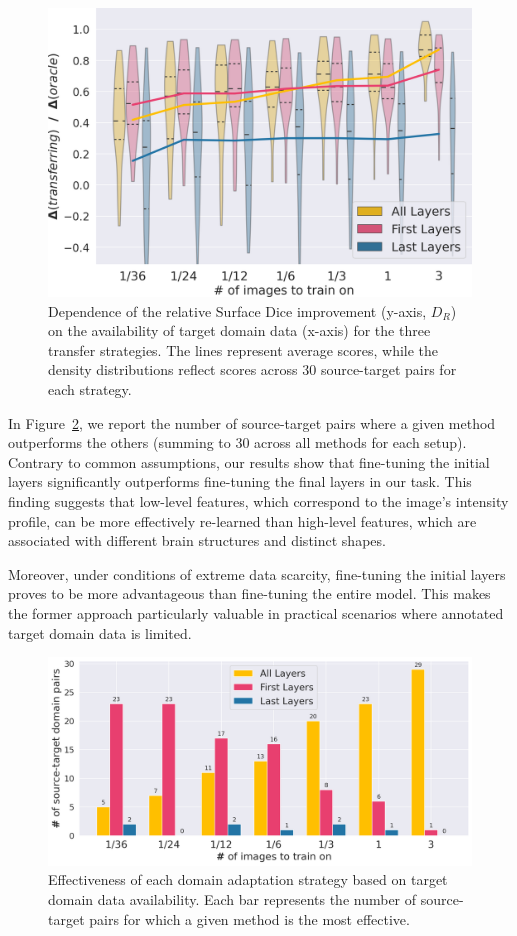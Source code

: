 \begin{figure}[h!]
	\includegraphics[width=\linewidth]{Dissertation/Figures/2_mri/gap.png}
	\caption{Dependence of the relative Surface Dice improvement (y-axis, $D_R$) on the availability of target domain data (x-axis) for the three transfer strategies. The lines represent average scores, while the density distributions reflect scores across 30 source-target pairs for each strategy.}
	\label{fig:gap}
\end{figure}

In Figure~\ref{fig:winners}, we report the number of source-target pairs where a given method outperforms the others (summing to 30 across all methods for each setup). Contrary to common assumptions, our results show that fine-tuning the initial layers significantly outperforms fine-tuning the final layers in our task. This finding suggests that low-level features, which correspond to the image's intensity profile, can be more effectively re-learned than high-level features, which are associated with different brain structures and distinct shapes.

Moreover, under conditions of extreme data scarcity, fine-tuning the initial layers proves to be more advantageous than fine-tuning the entire model. This makes the former approach particularly valuable in practical scenarios where annotated target domain data is limited.

\begin{figure}[h]
	\includegraphics[width=\linewidth]{Dissertation/Figures/2_mri/winners_1.png}
	\caption{Effectiveness of each domain adaptation strategy based on target domain data availability. Each bar represents the number of source-target pairs for which a given method is the most effective.}
	\label{fig:winners}
\end{figure}

